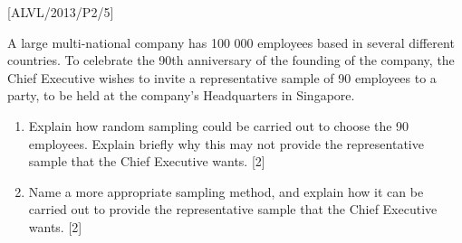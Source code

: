 \item {[}ALVL/2013/P2/5{]}

A large multi-national company has 100 000 employees based in several
different countries. To celebrate the 90th anniversary of the founding
of the company, the Chief Executive wishes to invite a representative
sample of 90 employees to a party, to be held at the company's Headquarters
in Singapore. 
\begin{enumerate}
\item Explain how random sampling could be carried out to choose the 90
employees. Explain briefly why this may not provide the representative
sample that the Chief Executive wants. \hfill{} {[}2{]}
\item Name a more appropriate sampling method, and explain how it can be
carried out to provide the representative sample that the Chief Executive
wants. \hfill{}{[}2{]}
\end{enumerate}

